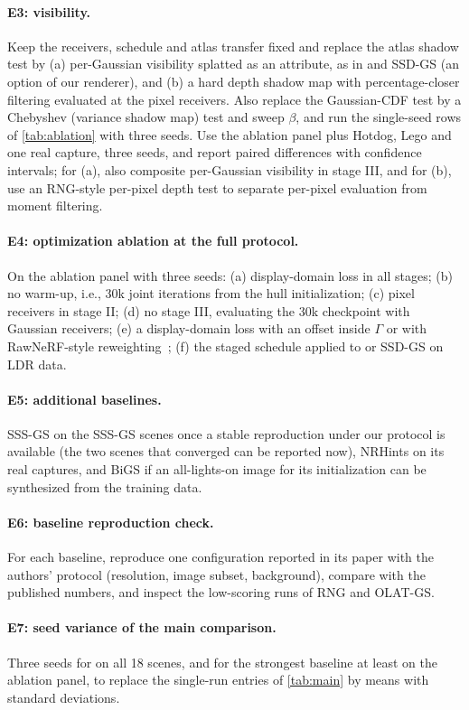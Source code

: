 \documentclass[10pt,twocolumn,letterpaper]{article}
\begin{document}
\paragraph{E3: visibility.}
Keep the receivers, schedule and atlas transfer fixed and replace the atlas shadow test by (a) per-Gaussian visibility splatted as an attribute, as in \gsthree and SSD-GS (an option of our renderer), and (b) a hard depth shadow map with percentage-closer filtering evaluated at the pixel receivers.
Also replace the Gaussian-CDF test by a Chebyshev (variance shadow map) test and sweep $\beta$, and run the single-seed rows of \cref{tab:ablation} with three seeds.
Use the ablation panel plus Hotdog, Lego and one real capture, three seeds, and report paired differences with confidence intervals; for (a), also composite per-Gaussian visibility in stage III, and for (b), use an RNG-style per-pixel depth test to separate per-pixel evaluation from moment filtering.

\paragraph{E4: optimization ablation at the full protocol.}
On the ablation panel with three seeds: (a) display-domain loss in all stages; (b) no warm-up, i.e., 30k joint iterations from the hull initialization; (c) pixel receivers in stage II; (d) no stage III, evaluating the 30k checkpoint with Gaussian receivers; (e) a display-domain loss with an offset inside $\Gamma$ or with RawNeRF-style reweighting~\cite{mildenhall2022nerf}; (f) the staged schedule applied to \gsthree or SSD-GS on LDR data.

\paragraph{E5: additional baselines.}
SSS-GS on the SSS-GS scenes once a stable reproduction under our protocol is available (the two scenes that converged can be reported now), NRHints on its real captures, and BiGS if an all-lights-on image for its initialization can be synthesized from the training data.

\paragraph{E6: baseline reproduction check.}
For each baseline, reproduce one configuration reported in its paper with the authors' protocol (resolution, image subset, background), compare with the published numbers, and inspect the low-scoring runs of RNG and OLAT-GS.

\paragraph{E7: seed variance of the main comparison.}
Three seeds for \ours on all 18 scenes, and for the strongest baseline at least on the ablation panel, to replace the single-run entries of \cref{tab:main} by means with standard deviations.
\end{document}
